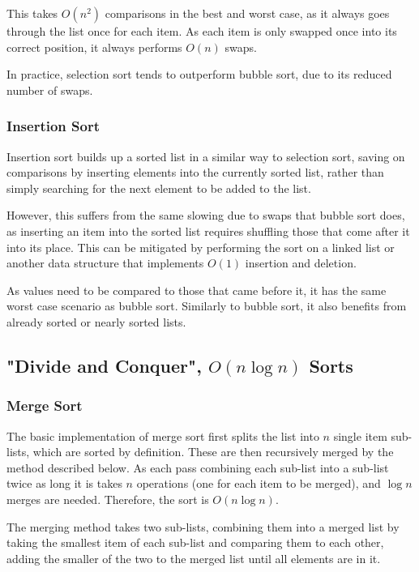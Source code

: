 \documentclass[]{article}
\begin{document}
This takes $O(n^2)$ comparisons in the best and worst case, as it always goes through the list once for each item. As each item is only swapped once into its correct position, it always performs $O(n)$ swaps.

In practice, selection sort tends to outperform bubble sort, due to its reduced number of swaps.

\subsubsection{Insertion Sort}

Insertion sort builds up a sorted list in a similar way to selection sort, saving on comparisons by inserting elements into the currently sorted list, rather than simply searching for the next element to be added to the list.

However, this suffers from the same slowing due to swaps that bubble sort does, as inserting an item into the sorted list requires shuffling those that come after it into its place. This can be mitigated by performing the sort on a linked list or another data structure that implements $O(1)$ insertion and deletion.

As values need to be compared to those that came before it, it has the same worst case scenario as bubble sort. Similarly to bubble sort, it also benefits from already sorted or nearly sorted lists.

\pagebreak

\subsection{"Divide and Conquer", $O(n\log{n})$ Sorts}

\subsubsection{Merge Sort}

The basic implementation of merge sort first splits the list into $n$ single item sub-lists, which are sorted by definition. These are then recursively merged by the method described below. As each pass combining each sub-list into a sub-list twice as long it is takes $n$ operations (one for each item to be merged), and $\log{n}$ merges are needed. Therefore, the sort is $O(n\log{n}) $.

The merging method takes two sub-lists, combining them into a merged list by taking the smallest item of each sub-list and comparing them to each other, adding the smaller of the two to the merged list until all elements are in it.
\end{document}
